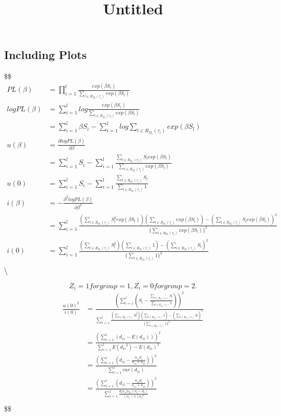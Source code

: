 \documentclass[]{article}
\title{Untitled}
\author{}
\date{\vspace{-2.5em}}
\begin{document}
\maketitle

\hypertarget{including-plots}{%
\subsection{Including Plots}\label{including-plots}}

\usepackage{mathrsfs}

\$\$\begin{align}
PL(\beta)&=\prod_{i=1}^{l}\frac{exp(\beta S_i)}{\sum_{l\in R_{D_i}(\tau_i)}exp(\beta S_l)}\\
logPL(\beta)&=\sum_{i=1}^{l}log\frac{exp(\beta S_i)}{\sum_{l\in R_{D_i}(\tau_i)}exp(\beta S_l)}\\
&=\sum_{i=1}^{l}\beta S_i-\sum_{i=1}^llog{\sum_{l\in R_{D_i}(\tau_i)}exp(\beta S_l)}\\

u(\beta)&=\frac{\partial logPL(\beta)}{\partial \beta}\\
&=\sum_{i=1}^{l}S_i-\sum_{i=1}^l\frac{\sum_{l\in R_{D_i}(\tau_i)}S_lexp(\beta S_l)}{\sum_{l\in R_{D_i}(\tau_i)}exp(\beta S_l)}\\
u(0)&=\sum_{i=1}^{l}S_i-\sum_{i=1}^l\frac{\sum_{l\in R_{D_i}(\tau_i)}S_l}{\sum_{l\in R_{D_i}(\tau_i)}1}\\

i(\beta)&=-\frac{\partial^2logPL(\beta)}{\partial \beta^2}\\
&=\sum_{i=1}^l\frac{(\sum_{l\in R_{D_i}(\tau_i)}S_l^2exp(\beta S_l))(\sum_{l\in R_{D_i}(\tau_i)}exp(\beta S_l))-(\sum_{l\in R_{D_i}(\tau_i)}S_lexp(\beta S_l))^2}{\{\sum_{l\in R_{D_i}(\tau_i)}exp(\beta S_l)\}^2}\\
i(0)&=\sum_{i=1}^l\frac{(\sum_{l\in R_{D_i}(\tau_i)}S_l^2)(\sum_{l\in R_{D_i}(\tau_i)}1)-(\sum_{l\in R_{D_i}(\tau_i)}S_l)^2}{\{\sum_{l\in R_{D_i}(\tau_i)}1\}^2}\\
\end{align}\textbackslash{}

\[
Z_i=1 for group = 1, Z_i=0 for group = 2.
\] \begin{align}
\frac{u(0)^2}{i(0)}&=\frac
{(\sum_{i=1}^{l}(S_i-\frac{\sum_{l\in R_{D_i}(\tau_i)}S_l}{\sum_{l\in R_{D_i}(\tau_i)}1}))^2}
{\sum_{i=1}^l\frac{(\sum_{l\in R_{D_i}(\tau_i)}S_l^2)(\sum_{l\in R_{D_i}(\tau_i)}1)-(\sum_{l\in R_{D_i}(\tau_i)}S_l)^2}{\{\sum_{l\in R_{D_i}(\tau_i)}1\}^2}}\\
&=\frac
{(\sum_{i=1}^{l}(d_{1i}-E(d_{1i})))^2}
{\sum_{i=1}^lE({d_{1i}}^2)-{E(d_{1i})}^2}\\
&=\frac
{(\sum_{i=1}^{l}(d_{1i}-\frac{n_{1i}d_i}{n_{1i}+n_{2i}}))^2}
{\sum_{i=1}^lvar(d_{1i})}\\
&=\frac
{(\sum_{i=1}^{l}(d_{1i}-\frac{n_{1i}d_i}{n_{1i}+n_{2i}}))^2}
{\sum_{i=1}^l\frac{d_in_{1i}n_{2i}(n_i-d_i)}{(n_i-1){n_i}^2}}\\
\end{align} \$\$
\end{document}
